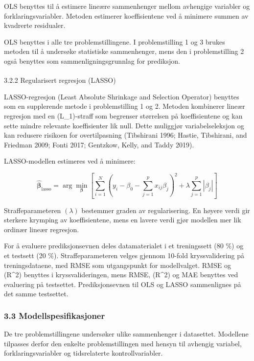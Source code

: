 \documentclass[
  letterpaper,
  DIV=11,
  numbers=noendperiod]{scrartcl}
\makeatletter
\let\oldparagraph\paragraph
\renewcommand{\paragraph}{
    \@ifstar
      \xxxParagraphStar
      \xxxParagraphNoStar
  }
\newcommand{\xxxParagraphStar}[1]{\oldparagraph*{#1}\mbox{}}
\newcommand{\xxxParagraphNoStar}[1]{\oldparagraph{#1}\mbox{}}
\makeatother
\begin{document}
OLS benyttes til å estimere lineære sammenhenger mellom avhengige
variabler og forklaringsvariabler. Metoden estimerer koeffisientene ved
å minimere summen av kvadrerte residualer.

OLS benyttes i alle tre problemstillingene. I problemstilling 1 og 3
brukes metoden til å undersøke statistiske sammenhenger, mens den i
problemstilling 2 også benyttes som sammenligningsgrunnlag for
prediksjon.

\paragraph{3.2.2 Regularisert regresjon
(LASSO)}\label{regularisert-regresjon-lasso}

LASSO-regresjon (Least Absolute Shrinkage and Selection Operator)
benyttes som en supplerende metode i problemstilling 1 og 2. Metoden
kombinerer lineær regresjon med en (L\_1)-straff som begrenser
størrelsen på koeffisientene og kan sette mindre relevante koeffisienter
lik null. Dette muliggjør variabelseleksjon og kan redusere risikoen for
overtilpasning (Tibshirani 1996; Hastie, Tibshirani, and Friedman 2009;
Fonti 2017; Gentzkow, Kelly, and Taddy 2019).

LASSO-modellen estimeres ved å minimere:

\[
\hat{\boldsymbol{\beta}}_{\text{lasso}}
=
\arg\min_{\boldsymbol{\beta}}
\left[
\sum_{i=1}^{N}
\left(
y_i-\beta_0-\sum_{j=1}^{p}x_{ij}\beta_j
\right)^2
+
\lambda\sum_{j=1}^{p}|\beta_j|
\right]
\]

Straffeparameteren \((\lambda)\) bestemmer graden av regularisering. En
høyere verdi gir sterkere krymping av koeffisientene, mens en lavere
verdi gjør modellen mer lik ordinær lineær regresjon.

For å evaluere prediksjonsevnen deles datamaterialet i et treningssett
(80 \%) og et testsett (20 \%). Straffeparameteren velges gjennom
10-fold kryssvalidering på treningsdataene, med RMSE som utgangspunkt
for modellvalget. RMSE og (R\^{}2) benyttes i kryssvalideringen, mens
RMSE, (R\^{}2) og MAE benyttes ved evaluering på testsettet.
Prediksjonsevnen til OLS og LASSO sammenlignes på det samme testsettet.

\subsubsection{3.3 Modellspesifikasjoner}\label{modellspesifikasjoner}

De tre problemstillingene undersøker ulike sammenhenger i datasettet.
Modellene tilpasses derfor den enkelte problemstillingen med hensyn til
avhengig variabel, forklaringsvariabler og tidsrelaterte
kontrollvariabler.
\end{document}
